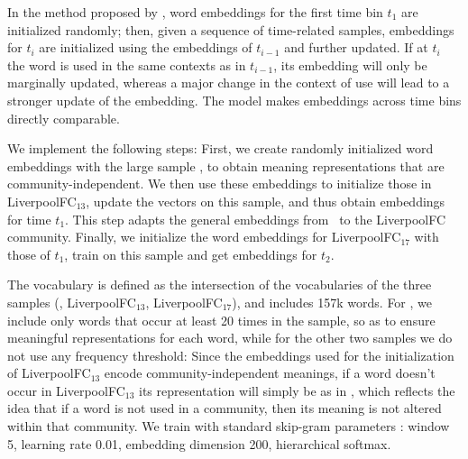 In the method proposed by , word
embeddings for the first time bin $t_1$ are initialized randomly; then,
given a sequence of time-related samples, embeddings for $t_i$
are initialized using the embeddings of $t_{i-1}$ and further
updated. 
If at $t_i$ the word is used in the same contexts as in $t_{i-1}$, its embedding will only be marginally updated, whereas a major change in the context of use will lead to a stronger update of the embedding. The model makes embeddings across time bins directly comparable.

We implement the following steps:
First, we create  randomly initialized word embeddings with the large sample \redd, to obtain meaning
representations that are community-independent.
We then use these embeddings
to initialize those in LiverpoolFC$_{13}$, update the vectors on this
sample, and thus obtain embeddings for time $t_1$. This step
adapts the general embeddings from \redd\  to the
LiverpoolFC community. Finally, we
initialize the word embeddings for LiverpoolFC$_{17}$ with those of
$t_1$, train on this sample and get embeddings for $t_2$.


The vocabulary is defined as the intersection of the
vocabularies of the three samples (\redd, LiverpoolFC$_{13}$,
LiverpoolFC$_{17}$), and includes 157k words.
For \redd, we include only words that occur at least 20 times in the
sample, so as to ensure meaningful representations for each word,
while for the other two samples we do not use any frequency
threshold: Since the embeddings used for the initialization of
LiverpoolFC$_{13}$ encode community-independent meanings, if a word doesn't occur in
LiverpoolFC$_{13}$ its representation will simply be as in \redd,
which reflects the idea that if a word is not used in a community, then its meaning is not altered within
that community. 
We train with standard skip-gram parameters \cite{levy2015improving}: window 5, learning rate 0.01, embedding dimension 200, hierarchical softmax.

